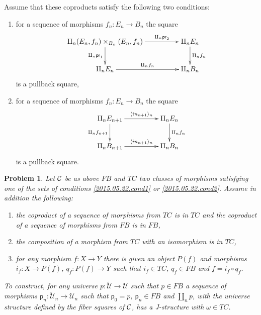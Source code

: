\documentclass[12pt]{article}
\numberwithin{equation}{section}
\newtheorem{problem}[proposition]{Problem}
\newcommand{\sr}{\rightarrow}
\newcommand{\wt}{\widetilde}
\newcommand{\p}{\mathsf{p}}
\newcommand{\U}{\mathcal{U}}
\newcommand{\pr}{\mathsf{pr}}
\begin{document}
Assume that these coproducts satisfy the following two conditions:
%
\begin{enumerate}
\item for a sequence of morphisms $f_n:E_n\sr B_n$ the square
%
$$
\begin{xy}
          \xymatrix@C=4pc{ \amalg_n (E_n,f_n)\times_{B_n}(E_n,f_n)
            \ar[r]^-{\amalg_n \pr_2} \ar[d]_{\amalg_n \pr_1} & \amalg_n E_n
            \ar[d]^{\amalg_n f_n}\\ \amalg_n E_n \ar[r]^-{\amalg_n f_n} &
            \amalg_n B_n }
\end{xy}
$$
%
is a pullback square,
%
\item for a sequence of morphisms $f_n:E_n\sr B_n$ the square
%
$$
\begin{xy}
          \xymatrix@C=4pc{ \amalg_n E_{n+1} \ar[r]^-{\langle in_{n+1}
              \rangle_{n}} \ar[d]_{\amalg_n f_{n+1}} & \amalg_n E_n
            \ar[d]^{\amalg_n f_n}\\ \amalg_n B_{n+1} \ar[r]^-{\langle in_{n+1}
              \rangle_{n}} & \amalg_n B_n }
\end{xy}
$$
%
is a pullback square.
\end{enumerate}
%
%
\begin{problem}
\label{2015.05.22.th2} Let $\cal C$ be as above $FB$ and $TC$ two classes of
morphisms satisfying one of the sets of conditions \ref{2015.05.22.cond1} or
\ref{2015.05.22.cond2}. Assume in addition the following:
%
\begin{enumerate}
\item the coproduct of a sequence of morphisms from $TC$ is in $TC$ and the
  coproduct of a sequence of morphisms from $FB$ is in $FB$,
\item the composition of a morphism from $TC$ with an isomorphism is in $TC$,
\item for any morphism $f: X \sr Y$ there is given an object $P(f)$ and
  morphisms $i_f:X\sr P(f)$, $q_f:P(f)\sr Y$ such that $i_f\in TC$, $q_f\in FB$
  and $f=i_f\circ q_f$.
\end{enumerate}
%
To construct, for any universe $p: \wt{\U}\sr \U$ such that $p\in FB$ a sequence
of morphisms $\p_n:\wt{\U}_n\sr \U_n$ such that $\p_0=p$, $\p_n\in FB$ and $\amalg_n
p$, with the universe structure defined by the fiber squares of $\cal C$, has a
J-structure with $\omega\in TC$.
\end{problem}
%
\end{document}
